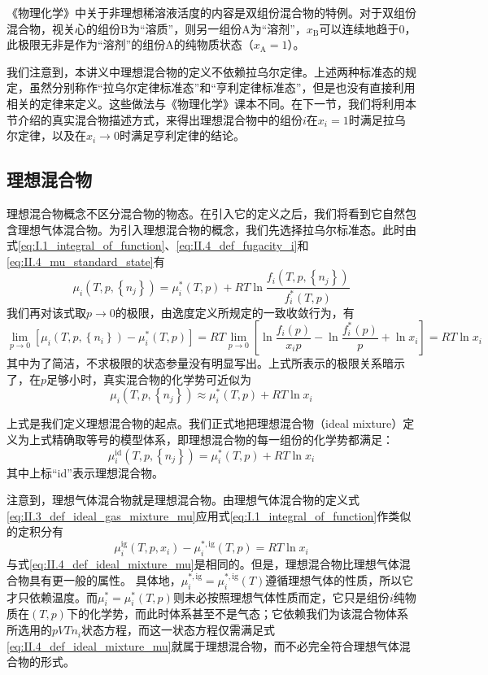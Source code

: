 \documentclass[main.tex]{subfiles}
\begin{document}
《物理化学》中关于非理想稀溶液活度的内容是双组份混合物的特例。对于双组份混合物，视关心的组份B为“溶质”，则另一组份A为“溶剂”，$x_\text{B}$可以连续地趋于0，此极限无非是作为“溶剂”的组份A的纯物质状态（$x_\text{A}=1$）。

我们注意到，本讲义中理想混合物的定义不依赖拉乌尔定律。上述两种标准态的规定，虽然分别称作“拉乌尔定律标准态”和“亨利定律标准态”，但是也没有直接利用相关的定律来定义。这些做法与《物理化学》课本不同。在下一节，我们将利用本节介绍的真实混合物描述方式，来得出理想混合物中的组份$i$在$x_i=1$时满足拉乌尔定律，以及在$x_i\rightarrow 0$时满足亨利定律的结论。

\subsection{理想混合物}
理想混合物概念不区分混合物的物态。在引入它的定义之后，我们将看到它自然包含理想气体混合物。为引入理想混合物的概念，我们先选择拉乌尔标准态。此时由式\eqref{eq:I.1_integral_of_function}、\eqref{eq:II.4_def_fugacity_i}和\eqref{eq:II.4_mu_standard_state}有
\[\mu_i\left(T,p,\left\{n_j\right\}\right)=\mu_i^*\left(T,p\right)+RT\ln\frac{f_i\left(T,p,\left\{n_j\right\}\right)}{f_i^*\left(T,p\right)}\]
我们再对该式取$p\rightarrow 0$的极限，由逸度定义所规定的一致收敛行为，有
\[\lim_{p\to 0}\left[\mu_i\left(T,p,\left\{n_i\right\}\right)-\mu_i^*\left(T,p\right)\right]=RT\lim_{p\to 0}\left[\ln\frac{f_i\left(p\right)}{x_ip}-\ln\frac{f_i^*\left(p\right)}{p}+\ln x_i\right]=RT\ln x_i\]
其中为了简洁，不求极限的状态参量没有明显写出。上式所表示的极限关系暗示了，在$p$足够小时，真实混合物的化学势可近似为
\[\mu_i\left(T,p,\left\{n_j\right\}\right)\approx\mu_i^*\left(T,p\right)+RT\ln x_i\]

上式是我们定义理想混合物的起点。我们正式地把理想混合物（ideal mixture）定义为上式精确取等号的模型体系，即理想混合物的每一组份的化学势都满足：
\begin{equation}\label{eq:II.4_def_ideal_mixture_mu}
    \mu_i^\text{id}\left(T,p,\left\{n_j\right\}\right)=\mu_i^*\left(T,p\right)+RT\ln x_i
\end{equation}
其中上标“id”表示理想混合物。

注意到，理想气体混合物就是理想混合物。由理想气体混合物的定义式\eqref{eq:II.3_def_ideal_gas_mixture_mu}应用式\eqref{eq:I.1_integral_of_function}作类似的定积分有
\[\mu_i^\text{ig}\left(T,p,x_i\right)-\mu_i^{*,\text{ig}}\left(T,p\right)=RT\ln x_i\]
与式\eqref{eq:II.4_def_ideal_mixture_mu}是相同的。但是，理想混合物比理想气体混合物具有更一般的属性。 具体地，$\mu_i^{*,\text{ig}}=\mu_i^{*,\text{ig}}\left(T\right)$遵循理想气体的性质，所以它才只依赖温度。而$\mu_i^*=\mu_i^*\left(T,p\right)$则未必按照理想气体性质而定，它只是组份$i$纯物质在$\left(T,p\right)$下的化学势，而此时体系甚至不是气态；它依赖我们为该混合物体系所选用的$pVTn_i$状态方程，而这一状态方程仅需满足式\eqref{eq:II.4_def_ideal_mixture_mu}就属于理想混合物，而不必完全符合理想气体混合物的形式。
\end{document}
